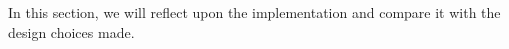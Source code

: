 In this section, we will reflect upon the implementation and compare it with the design choices made.
